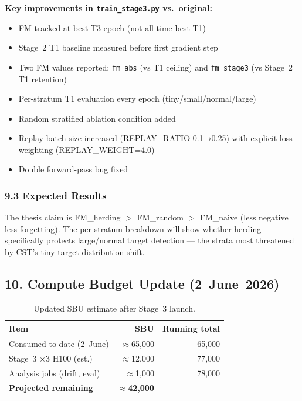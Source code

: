 \noindent \textbf{Key improvements in \texttt{train\_stage3.py} vs.\ original:}
\begin{itemize}
    \item FM tracked at best T3 epoch (not all-time best T1)
    \item Stage~2 T1 baseline measured before first gradient step
    \item Two FM values reported: \texttt{fm\_abs} (vs T1 ceiling) and
          \texttt{fm\_stage3} (vs Stage~2 T1 retention)
    \item Per-stratum T1 evaluation every epoch (tiny/small/normal/large)
    \item Random stratified ablation condition added
    \item Replay batch size increased (REPLAY\_RATIO 0.1→0.25) with
          explicit loss weighting (REPLAY\_WEIGHT=4.0)
    \item Double forward-pass bug fixed
\end{itemize}

\subsubsection*{9.3 Expected Results}

The thesis claim is FM\_herding $>$ FM\_random $>$ FM\_naive (less
negative = less forgetting). The per-stratum breakdown will show
whether herding specifically protects large/normal target detection —
the strata most threatened by CST's tiny-target distribution shift.

\subsection*{10. Compute Budget Update (2~June~2026)}

\begin{table}[h]
\centering
\caption{Updated SBU estimate after Stage~3 launch.}
\label{tab:budget_w22}
\small
\begin{tabular}{lrr}
\hline
\textbf{Item} & \textbf{SBU} & \textbf{Running total} \\
\hline
Consumed to date (2~June)       & $\approx$65,000 & 65,000 \\
Stage~3 $\times$3 H100 (est.)   & $\approx$12,000 & 77,000 \\
Analysis jobs (drift, eval)     & $\approx$1,000  & 78,000 \\
\hline
\textbf{Projected remaining}    & \textbf{$\approx$42,000} & \\
\hline
\end{tabular}
\end{table}

